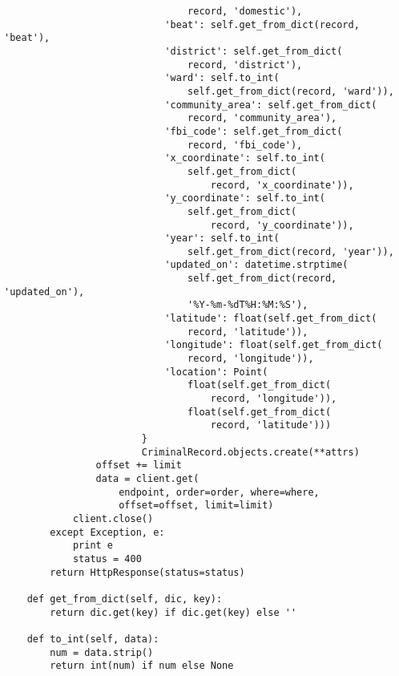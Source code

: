 \begin{small}
\begin{verbatim}
                                record, 'domestic'),
                            'beat': self.get_from_dict(record, 'beat'),
                            'district': self.get_from_dict(
                                record, 'district'),
                            'ward': self.to_int(
                                self.get_from_dict(record, 'ward')),
                            'community_area': self.get_from_dict(
                                record, 'community_area'),
                            'fbi_code': self.get_from_dict(
                                record, 'fbi_code'),
                            'x_coordinate': self.to_int(
                                self.get_from_dict(
                                    record, 'x_coordinate')),
                            'y_coordinate': self.to_int(
                                self.get_from_dict(
                                    record, 'y_coordinate')),
                            'year': self.to_int(
                                self.get_from_dict(record, 'year')),
                            'updated_on': datetime.strptime(
                                self.get_from_dict(record, 'updated_on'),
                                '%Y-%m-%dT%H:%M:%S'),
                            'latitude': float(self.get_from_dict(
                                record, 'latitude')),
                            'longitude': float(self.get_from_dict(
                                record, 'longitude')),
                            'location': Point(
                                float(self.get_from_dict(
                                    record, 'longitude')),
                                float(self.get_from_dict(
                                    record, 'latitude')))
                        }
                        CriminalRecord.objects.create(**attrs)
                offset += limit
                data = client.get(
                    endpoint, order=order, where=where,
                    offset=offset, limit=limit)
            client.close()
        except Exception, e:
            print e
            status = 400
        return HttpResponse(status=status)

    def get_from_dict(self, dic, key):
        return dic.get(key) if dic.get(key) else ''

    def to_int(self, data):
        num = data.strip()
        return int(num) if num else None
\end{verbatim}
\end{small}